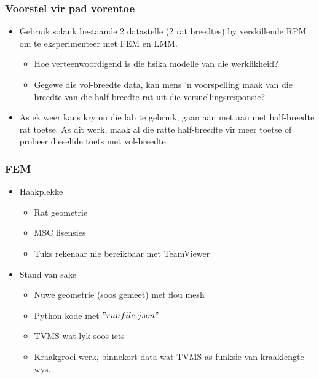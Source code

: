 \documentclass{beamer}
\begin{document}
\begin{frame}
\frametitle{Voorstel vir pad vorentoe}
\begin{itemize}
	\item Gebruik solank bestaande 2 datastelle (2 rat breedtes) by verskillende RPM om  te eksperimenteer met FEM en LMM.
	\begin{itemize}
	  \item Hoe verteenwoordigend is die fisika modelle van die werklikheid? 
	\item Gegewe die vol-breedte data, kan mens 'n voorspelling maak van die breedte van die half-breedte rat uit die versnellingsresponsie? 
	\end{itemize}

	\item As ek weer kans kry on die lab te gebruik, gaan aan met aan met half-breedte rat toetse. As dit werk, maak al die ratte half-breedte vir meer toetse of probeer dieselfde toets met vol-breedte. 
\end{itemize}
\end{frame}



\begin{frame}
\frametitle{FEM}
\begin{itemize}
\item Haakplekke 
\begin{itemize}		
	\item Rat geometrie
	\item MSC lisensies
 \item Tuks rekenaar nie bereikbaar met TeamViewer
 \end{itemize}
\item Stand van sake 	
\begin{itemize}
	\item Nuwe geometrie (soos gemeet) met flou mesh
	\item Python kode met $"runfile.json"$
	\item TVMS wat lyk soos iets
	\item Kraakgroei werk, binnekort data wat TVMS as funksie van kraaklengte wys. 
\end{itemize}	 



\end{itemize}
\end{frame}
\end{document}
